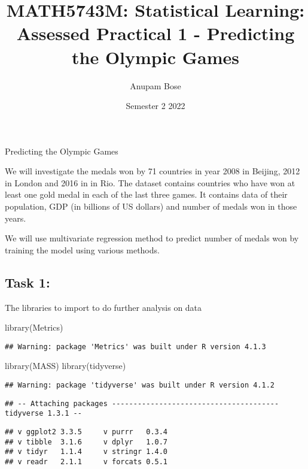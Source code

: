 \documentclass[
]{article}
\title{MATH5743M: Statistical Learning: Assessed Practical 1 -
Predicting the Olympic Games}
\author{Anupam Bose}
\date{Semester 2 2022}
\newenvironment{Shaded}{\begin{snugshade}}{\end{snugshade}}
\newcommand{\FunctionTok}[1]{\textcolor[rgb]{0.00,0.00,0.00}{#1}}
\newcommand{\NormalTok}[1]{#1}
\begin{document}
\maketitle

Predicting the Olympic Games

We will investigate the medals won by 71 countries in year 2008 in
Beijing, 2012 in London and 2016 in in Rio. The dataset contains
countries who have won at least one gold medal in each of the last three
games. It contains data of their population, GDP (in billions of US
dollars) and number of medals won in those years.

We will use multivariate regression method to predict number of medals
won by training the model using various methods.

\hypertarget{task-1}{%
\subsection{Task 1:}\label{task-1}}

The libraries to import to do further analysis on data

\begin{Shaded}
\begin{Highlighting}[]
\FunctionTok{library}\NormalTok{(Metrics)}
\end{Highlighting}
\end{Shaded}

\begin{verbatim}
## Warning: package 'Metrics' was built under R version 4.1.3
\end{verbatim}

\begin{Shaded}
\begin{Highlighting}[]
\FunctionTok{library}\NormalTok{(MASS)}
\FunctionTok{library}\NormalTok{(tidyverse)}
\end{Highlighting}
\end{Shaded}

\begin{verbatim}
## Warning: package 'tidyverse' was built under R version 4.1.2
\end{verbatim}

\begin{verbatim}
## -- Attaching packages --------------------------------------- tidyverse 1.3.1 --
\end{verbatim}

\begin{verbatim}
## v ggplot2 3.3.5     v purrr   0.3.4
## v tibble  3.1.6     v dplyr   1.0.7
## v tidyr   1.1.4     v stringr 1.4.0
## v readr   2.1.1     v forcats 0.5.1
\end{verbatim}
\end{document}
